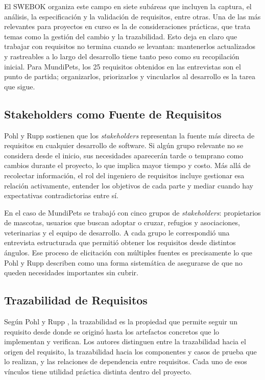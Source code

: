 \documentclass[journal,onecolumn]{IEEEtran}
\begin{document}
El SWEBOK \cite{swebok2024} organiza este campo en siete subáreas que incluyen la captura, el
análisis, la especificación y la validación de requisitos, entre otras. Una de las más relevantes
para proyectos en curso es la de consideraciones prácticas, que trata temas como la gestión del
cambio y la trazabilidad. Esto deja en claro que trabajar con requisitos no termina cuando se
levantan: mantenerlos actualizados y rastreables a lo largo del desarrollo tiene tanto peso como
su recopilación inicial. Para MundiPets, los 25 requisitos obtenidos en las entrevistas son el
punto de partida; organizarlos, priorizarlos y vincularlos al desarrollo es la tarea que sigue.

\subsection{Stakeholders como Fuente de Requisitos}

Pohl y Rupp \cite{pohl2015} sostienen que los \textit{stakeholders} representan la fuente más
directa de requisitos en cualquier desarrollo de software. Si algún grupo relevante no se considera
desde el inicio, sus necesidades aparecerán tarde o temprano como cambios durante el proyecto, lo
que implica mayor tiempo y costo. Más allá de recolectar información, el rol del ingeniero de
requisitos incluye gestionar esa relación activamente, entender los objetivos de cada parte y
mediar cuando hay expectativas contradictorias entre sí.

En el caso de MundiPets se trabajó con cinco grupos de \textit{stakeholders}: propietarios de
mascotas, usuarios que buscan adoptar o cruzar, refugios y asociaciones, veterinarias y el equipo
de desarrollo. A cada grupo le correspondió una entrevista estructurada que permitió obtener los
requisitos desde distintos ángulos. Ese proceso de elicitación con múltiples fuentes es
precisamente lo que Pohl y Rupp \cite{pohl2015} describen como una forma sistemática de asegurarse
de que no queden necesidades importantes sin cubrir.

\subsection{Trazabilidad de Requisitos}

Según Pohl y Rupp \cite{pohl2015}, la trazabilidad es la propiedad que permite seguir un requisito
desde donde se originó hasta los artefactos concretos que lo implementan y verifican. Los autores
distinguen entre la trazabilidad hacia el origen del requisito, la trazabilidad hacia los
componentes y casos de prueba que lo realizan, y las relaciones de dependencia entre requisitos.
Cada uno de esos vínculos tiene utilidad práctica distinta dentro del proyecto.
\end{document}
